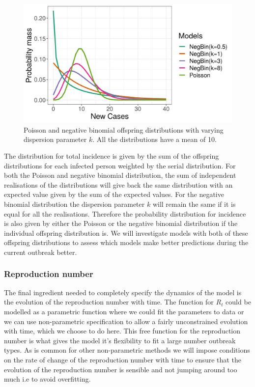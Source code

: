 \documentclass[12pt]{article}
\begin{document}
\begin{figure}[h]
  \centering
  \includegraphics[width=\textwidth]{../output/prob_dist.png}
  \caption{Poisson and negative binomial offspring distributions with varying dispersion parameter $k$. All the distributions have a mean of 10.}
  \label{fig:offspring}
\end{figure}

The distribution for total incidence is given by the sum of the offspring distributions for each infected person weighted by the serial distribution. For both the Poisson and negative binomial distribution, the sum of independent realisations of the distributions will give back the same distribution with an expected value given by the sum of the expected values. For the negative binomial distribution the dispersion parameter $k$ will remain the same if it is equal for all the realisations. Therefore the probability distribution for incidence is also given by either the Poisson or the negative binomial distribution if the individual offspring distribution is. We will investigate models with both of these offspring distributions to assess which models make better predictions during the current outbreak better.

\subsubsection{Reproduction number}
The final ingredient needed to completely specify the dynamics of the model is the evolution of the reproduction number with time. The function for $R_t$ could be modelled as a parametric function where we could fit the parameters to data or we can use non-parametric specification to allow a fairly unconstrained evolution with time, which we choose to do here. This free function for the reproduction number is what gives the model it's flexibility to fit a large number outbreak types. As is common for other non-parametric methods we will impose conditions on the rate of change of the reproduction number with time to ensure that the evolution of the reproduction number is sensible and not jumping around too much i.e to avoid overfitting.
\end{document}
